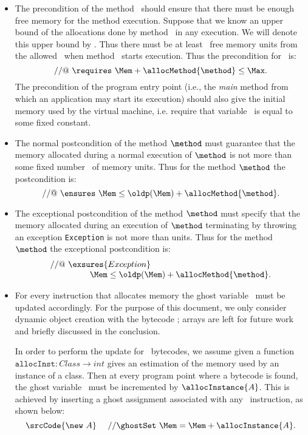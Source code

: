 \begin{itemize}
\item The precondition of the method \method\ should ensure
that there must be enough free memory for the method
execution. Suppose that we know an upper bound of the allocations done
by method \method\ in any execution. We will denote this upper
bound by \allocMethod{\method}. Thus there must be at least
\allocMethod{\method}\ free memory units from the allowed \Max\ when
method \method\ starts execution. Thus the precondition for \method\ is:
$$
//@ \ \requires \ \Mem + \allocMethod{\method}  \leq \Max.
$$
The precondition of the program entry point (i.e., the \textit{main} 
method from which an application may start its execution) should 
also give the initial memory used by the virtual machine, i.e.
require that variable \Mem\ is equal to some fixed constant.

\item The normal postcondition of the method $\method$ must
guarantee that the memory allocated during a normal execution of
$\method$ is not more than some fixed number \allocMethod{\method}\
of memory units. Thus for the method $\method$ the postcondition is:
$$
//@ \ \ensures \ \Mem \leq \oldp(\Mem) + \allocMethod{\method}.
$$

\item The exceptional postcondition of the method $\method$ must
specify that the memory allocated during an execution of $\method$ 
terminating by throwing an exception \texttt{Exception} is not more
than \allocMethod{\method} units. Thus for the method $\method$ the
exceptional postcondition is:
$$
\begin{array}{l}
//@ \ \exsures{Exception} \\
\ \ \ \ \ \ \ \ \ \ \ \ \ \  \Mem \leq \oldp(\Mem) + \allocMethod{\method}.
\end{array}
$$




\item For every instruction that allocates memory the ghost
variable \Mem\ must be updated accordingly. For the purpose of
this document, we only consider dynamic object creation with the 
bytecode \new; arrays are left for future work and briefly discussed 
in the conclusion. 

In order to perform the update for \new\ bytecodes, we assume given a
function $\texttt{allocInst}: Class \rightarrow int$ gives an
estimation of the memory used by an instance of a class. Then at every
program point where a bytecode \srcCode{\new \ A} is found, the ghost
variable \Mem\ must be incremented by $\allocInstance{A}$. This is
achieved by inserting a ghost assignment associated with any \new\
instruction, as shown below:
$$
\srcCode{\new \ A} \ \ \ \ // \ghostSet \ \Mem = \Mem + \allocInstance{A}.
$$
\end{itemize}
